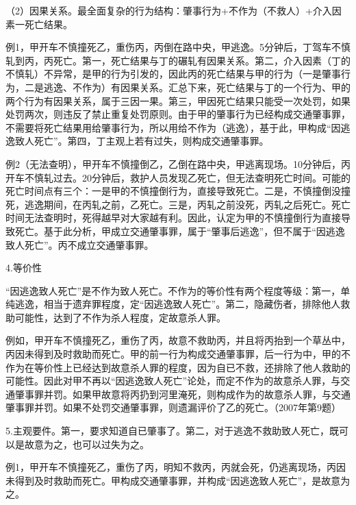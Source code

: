 （2）因果关系。最全面复杂的行为结构：肇事行为+不作为（不救人）+介入因素一死亡结果。

例1，甲开车不慎撞死乙，重伤丙，丙倒在路中央，甲逃逸。5分钟后，丁驾车不慎轧到丙，丙死亡。第一，死亡结果与丁的碾轧有因果关系。第二，介入因素（丁的不慎轧）不异常，是甲的行为引发的，因此丙的死亡结果与甲的行为（一是肇事行为，二是逃逸、不作为）有因果关系。汇总下来，死亡结果与丁的一个行为、甲的两个行为有因果关系，属于三因一果。第三，甲因死亡结果只能受一次处罚，如果处罚两次，则违反了禁止重复处罚原则。由于甲的肇事行为已经构成交通肇事罪，不需要将死亡结果用给肇事行为，所以用给不作为（逃逸），基于此，甲构成“因逃逸致人死亡”。第四，丁主观上若有过失，则构成交通肇事罪。

例2（无法查明），甲开车不慎撞倒乙，乙倒在路中央，甲逃离现场。10分钟后，丙开车不慎轧过去。20分钟后，救护人员发现乙死亡，但无法查明死亡时间。可能的死亡时间点有三个：一是甲的不慎撞倒行为，直接导致死亡。二是，不慎撞倒没撞死，逃逸期间，在丙轧之前，乙死亡。三是，丙轧之前没死，丙轧之后死亡。死亡时间无法查明时，死得越早对大家越有利。因此，认定为甲的不慎撞倒行为直接导致死亡。基于此分析，甲成立交通肇事罪，属于“肇事后逃逸”，但不属于“因逃逸致人死亡”。丙不成立交通肇事罪。

4.等价性

“因逃逸致人死亡”是不作为致人死亡。不作为的等价性有两个程度等级：第一，单纯逃逸，相当于遗弃罪程度，定“因逃逸致人死亡”。第二，隐藏伤者，排除他人救助可能性，达到了不作为杀人程度，定故意杀人罪。

例如，甲开车不慎撞死乙，重伤了丙，故意不救助丙，并且将丙抬到一个草丛中，丙因未得到及时救助而死亡。甲的前一行为构成交通肇事罪，后一行为中，甲的不作为在等价性上已经达到故意杀人罪的程度，因为自已不救，还排除了他人救助的可能性。因此对甲不再以“因逃逸致人死亡”论处，而定不作为的故意杀人罪，与交通肇事罪并罚。如果甲故意将丙扔到河里淹死，则构成作为的故意杀人罪，与交通肇事罪并罚。如果不处罚交通肇事罪，则遗漏评价了乙的死亡。（2007年第9题）

5.主观要件。第一，要求知道自已肇事了。第二，对于逃逸不救助致人死亡，既可以是故意为之，也可以过失为之。

例1，甲开车不慎撞死乙，重伤了丙，明知不救丙，丙就会死，仍逃离现场，丙因未得到及时救助而死亡。甲构成交通肇事罪，并构成“因逃逸致人死亡”，是故意为之。

